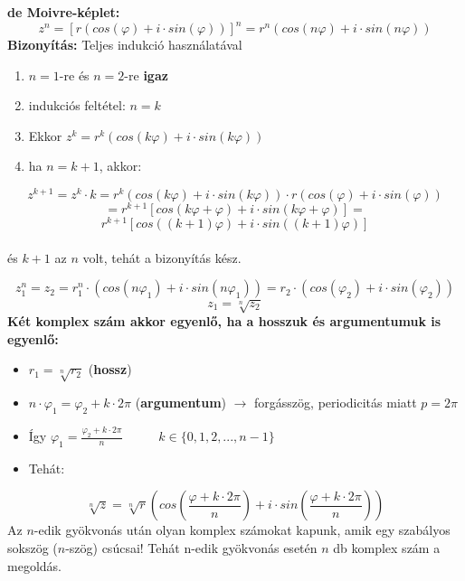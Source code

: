 \documentclass[12pt,a4paper]{article}
\begin{document}
\begin{tcolorbox}[colback=green!5!white,colframe=green!60!black,title= 5. Komplex számok hatványozása]
    \textbf{de Moivre-képlet:} 
    $$z^n = [r(cos(\varphi)+i\cdot sin(\varphi))]^n=r^n(cos(n\varphi)+i\cdot sin(n\varphi))$$
    \textbf{Bizonyítás:} Teljes indukció használatával
    \begin{enumerate}
        \item \(n=1\)-re és \(n=2\)-re \textbf{igaz}
        \item indukciós feltétel: \(n = k\)
        \item Ekkor \(z^k= r^k(cos(k\varphi)+i\cdot sin(k\varphi))\)
        \item ha \(n = k + 1\), akkor:
    \end{enumerate}
    $$z^{k+1}=z^k\cdot k = r^k(cos(k\varphi)+i\cdot sin(k\varphi))\cdot r(cos(\varphi) +i\cdot sin(\varphi))$$
    $$=r^{k+1}[cos(k\varphi + \varphi)+ i\cdot sin(k\varphi + \varphi)] =$$
    $$r^{k+1}[cos((k+1)\varphi)+ i\cdot sin((k+1)\varphi)] $$\\
    és \(k+1\) az \(n\) volt, tehát a bizonyítás kész.

\end{tcolorbox}

\begin{tcolorbox}[colback=green!5!white,colframe=green!60!black,title= 6. Komplex számok gyökvonása]
$$z_1^n = z_2=r_1^n\cdot (cos(n\varphi_1)+i\cdot sin(n\varphi_1)) = r_2\cdot (cos(\varphi_2)+i\cdot sin(\varphi_2))$$  
$$z_1 = \sqrt[n]{z_2} $$  
\textbf{Két komplex szám akkor egyenlő, ha a hosszuk és argumentumuk is egyenlő:}
    \begin{itemize}
        \item \(r_1= \sqrt[n]{r_2}\) \hspace{61pt} (\textbf{hossz})
        \item \(n\cdot \varphi_1 = \varphi_2 + k\cdot 2\pi\) \hspace{10pt} (\textbf{argumentum}) \(\rightarrow\) forgásszög, periodicitás miatt \(p = 2\pi \)
        \item Így \(\varphi_1 = \frac{\varphi_2+k\cdot2\pi}{n} \hspace{30pt}\) \(k \in \{0, 1, 2, ... , n - 1\}\)
        \item Tehát: 
    \end{itemize}
    $$\sqrt[n]{z}= \sqrt[n]{r}(cos(\frac{\varphi+k\cdot2\pi}{n}) + i\cdot sin(\frac{\varphi+k\cdot2\pi}{n}))$$
    Az \(n\)-edik gyökvonás után olyan komplex számokat kapunk, amik egy szabályos sokszög
    (\(n\)-szög) csúcsai! Tehát n-edik gyökvonás esetén \(n\) db komplex szám a megoldás.
\end{tcolorbox}
\newpage
\end{document}
